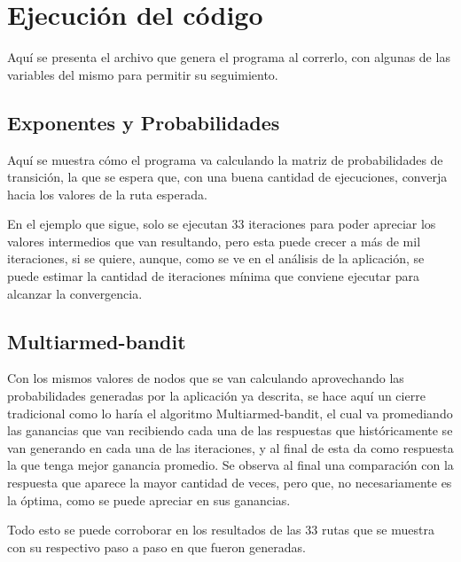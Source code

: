 \chapter{Ejecución del código}
\label{run1}
Aquí se presenta el archivo que genera el programa al correrlo, con algunas de las variables del mismo para permitir su seguimiento.

\section{Exponentes y Probabilidades} 
Aquí se muestra cómo el programa va calculando la matriz de probabilidades de transición, la que se espera que, con una buena cantidad de ejecuciones, converja hacia los valores de la ruta esperada.

En el ejemplo que sigue, solo se ejecutan 33 iteraciones para poder apreciar los valores intermedios que van resultando, pero esta puede crecer a más de mil iteraciones, si se quiere, aunque, como se ve en el análisis de la aplicación, se puede estimar la cantidad de iteraciones mínima que conviene ejecutar para alcanzar la convergencia.



\section{Multiarmed-bandit} 
Con los mismos valores de nodos que se van calculando aprovechando las probabilidades generadas por la aplicación ya descrita, se hace aquí un cierre tradicional como lo haría el algoritmo Multiarmed-bandit, el cual va promediando las ganancias que van recibiendo cada una de las respuestas que históricamente se van generando en cada una de las iteraciones, y al final de esta da como respuesta la que tenga mejor ganancia promedio.
Se observa al final una comparación con la respuesta que aparece la mayor cantidad de veces, pero que, no necesariamente es la óptima, como se puede apreciar en sus ganancias.

Todo esto se puede corroborar en los resultados de las 33 rutas que se muestra con su respectivo paso a paso en que fueron generadas.


